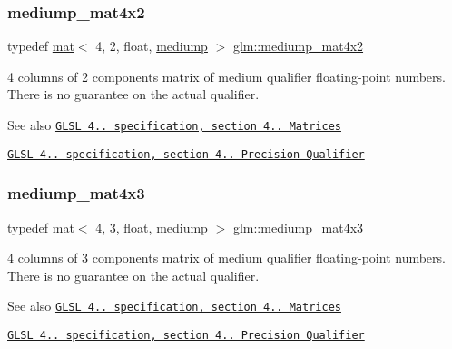 \subsubsection{\texorpdfstring{mediump\+\_\+mat4x2}{mediump\_mat4x2}}
{\footnotesize\ttfamily typedef \hyperlink{structglm_1_1mat}{mat}$<$ 4, 2, float, \hyperlink{namespaceglm_a36ed105b07c7746804d7fdc7cc90ff25a6416f3ea0c9025fb21ed50c4d6620482}{mediump} $>$ \hyperlink{group__core__precision_gaf0c9bd4c952160fa6f63ae8ab243beea}{glm\+::mediump\+\_\+mat4x2}}

4 columns of 2 components matrix of medium qualifier floating-\/point numbers. There is no guarantee on the actual qualifier.

\begin{DoxySeeAlso}{See also}
\href{http://www.opengl.org/registry/doc/GLSLangSpec.4.20.8.pdf}{\tt G\+L\+SL 4.. specification, section 4.. Matrices} 

\href{http://www.opengl.org/registry/doc/GLSLangSpec.4.20.8.pdf}{\tt G\+L\+SL 4.. specification, section 4.. Precision Qualifier} 
\end{DoxySeeAlso}
\mbox{\label{group__core__precision_ga2d5eb7a43e7564b4e048512b8488994a}} 
\subsubsection{\texorpdfstring{mediump\+\_\+mat4x3}{mediump\_mat4x3}}
{\footnotesize\ttfamily typedef \hyperlink{structglm_1_1mat}{mat}$<$ 4, 3, float, \hyperlink{namespaceglm_a36ed105b07c7746804d7fdc7cc90ff25a6416f3ea0c9025fb21ed50c4d6620482}{mediump} $>$ \hyperlink{group__core__precision_ga2d5eb7a43e7564b4e048512b8488994a}{glm\+::mediump\+\_\+mat4x3}}

4 columns of 3 components matrix of medium qualifier floating-\/point numbers. There is no guarantee on the actual qualifier.

\begin{DoxySeeAlso}{See also}
\href{http://www.opengl.org/registry/doc/GLSLangSpec.4.20.8.pdf}{\tt G\+L\+SL 4.. specification, section 4.. Matrices} 

\href{http://www.opengl.org/registry/doc/GLSLangSpec.4.20.8.pdf}{\tt G\+L\+SL 4.. specification, section 4.. Precision Qualifier} 
\end{DoxySeeAlso}
\mbox{\label{group__core__precision_ga80dd7aaae2879e86a588c36a39652ee4}} 
